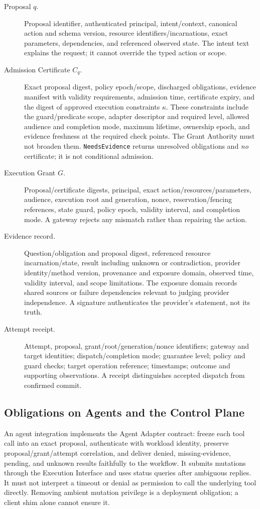 \begin{description}
\item[Proposal $q$.] Proposal identifier, authenticated principal, intent/context, canonical action and schema version, resource identifiers/incarnations, exact parameters, dependencies, and referenced observed state. The intent text explains the request; it cannot override the typed action or scope.
\item[Admission Certificate $C_q$.] Exact proposal digest, policy epoch/scope, discharged obligations, evidence manifest with validity requirements, admission time, certificate expiry, and the digest of approved execution constraints $\kappa$. These constraints include the guard/predicate scope, adapter descriptor and required level, allowed audience and completion mode, maximum lifetime, ownership epoch, and evidence freshness at the required check points. The Grant Authority must not broaden them. \texttt{NeedsEvidence} returns unresolved obligations and \emph{no} certificate; it is not conditional admission.
\item[Execution Grant $G$.] Proposal/certificate digests, principal, exact action/resources/parameters, audience, execution root and generation, nonce, reservation/fencing references, state guard, policy epoch, validity interval, and completion mode. A gateway rejects any mismatch rather than repairing the action.
\item[Evidence record.] Question/obligation and proposal digest, referenced resource incarnation/state, result including unknown or contradiction, provider identity/method version, provenance and exposure domain, observed time, validity interval, and scope limitations. The exposure domain records shared sources or failure dependencies relevant to judging provider independence. A signature authenticates the provider's statement, not its truth.
\item[Attempt receipt.] Attempt, proposal, grant/root/generation/nonce identifiers; gateway and target identities; dispatch/completion mode; guarantee level; policy and guard checks; target operation reference; timestamps; outcome and supporting observations. A receipt distinguishes accepted dispatch from confirmed commit.
\end{description}

\subsection{Obligations on Agents and the Control Plane}
An agent integration implements the Agent Adapter contract: freeze each tool call into an exact proposal, authenticate with workload identity, preserve proposal/grant/attempt correlation, and deliver denied, missing-evidence, pending, and unknown results faithfully to the workflow. It submits mutations through the Execution Interface and uses status queries after ambiguous replies. It must not interpret a timeout or denial as permission to call the underlying tool directly. Removing ambient mutation privilege is a deployment obligation; a client shim alone cannot ensure it.

